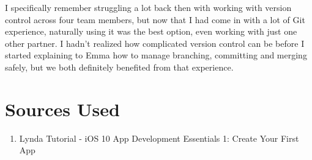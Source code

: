 \documentclass[12pt]{article}
\begin{document}
\noindent I specifically remember struggling a lot back then with working with version control across four team members, but now that I had come in with a lot of Git experience, naturally using it was the best option, even working with just one other partner. I hadn't realized how complicated version control can be before I started explaining to Emma how to manage branching, committing and merging safely, but we both definitely benefited from that experience.

\section{Sources Used}
\begin{enumerate}
\item Lynda Tutorial - iOS 10 App Development Essentials 1: Create Your First App
\end{enumerate}
\end{document}
